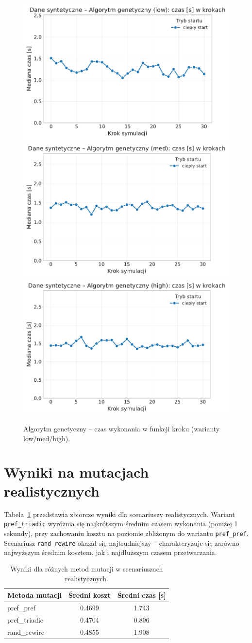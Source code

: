 \begin{figure}[H]
  \centering
  \includegraphics[width=0.32\linewidth]{assets/figures/dynamic/synthetic/synthetic_algorytm_genetyczny_time_over_steps_low.pdf}
  \includegraphics[width=0.32\linewidth]{assets/figures/dynamic/synthetic/synthetic_algorytm_genetyczny_time_over_steps_med.pdf}
  \includegraphics[width=0.32\linewidth]{assets/figures/dynamic/synthetic/synthetic_algorytm_genetyczny_time_over_steps_high.pdf}
  \caption{Algorytm genetyczny -- czas wykonania w funkcji kroku (warianty low/med/high).}
  \label{fig:dyn-synth-genetic-time}
\end{figure}

\section{Wyniki na mutacjach realistycznych}

Tabela~\ref{tab:dyn-real-warm} przedstawia zbiorcze wyniki dla scenariuszy realistycznych. Wariant \texttt{pref\_triadic} wyróżnia się najkrótszym średnim czasem wykonania (poniżej 1 sekundy), przy zachowaniu kosztu na poziomie zbliżonym do wariantu \texttt{pref\_pref}. Scenariusz \texttt{rand\_rewire} okazał się najtrudniejszy -- charakteryzuje się zarówno najwyższym średnim kosztem, jak i najdłuższym czasem przetwarzania.

\begin{table}[H]
  \centering
  \caption{Wyniki dla różnych metod mutacji w scenariuszach realistycznych.}
  \label{tab:dyn-real-warm}
  \begin{tabular}{lcc}
    \toprule
    \textbf{Metoda mutacji} & \textbf{Średni koszt} & \textbf{Średni czas [s]} \\
    \midrule
    pref\_pref              & 0.4699                & 1.743                    \\
    pref\_triadic           & 0.4704                & 0.896                    \\
    rand\_rewire            & 0.4855                & 1.908                    \\
    \bottomrule
  \end{tabular}
\end{table}

